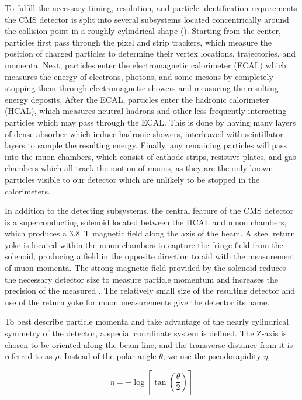 To fulfill the necessary timing, resolution, and particle identification requirements the CMS detector is split into several subsystems located concentrically around the collision point in a roughly cylindrical shape (). 
Starting from the center, particles first pass through the pixel and strip trackers, which measure the position of charged particles to determine their vertex locations, trajectories, and momenta.
Next, particles enter the electromagnetic calorimeter (ECAL) which measures the energy of electrons, photons, and some mesons by completely stopping them through electromagnetic showers and measuring the resulting energy deposits.
After the ECAL, particles enter the hadronic calorimeter (HCAL), which measures neutral hadrons and other less-frequently-interacting particles which may pass through the ECAL. This is done by having many layers of dense absorber which induce hadronic showers, interleaved with scintillator layers to sample the resulting energy.
Finally, any remaining particles will pass into the muon chambers, which consist of cathode strips, resistive plates, and gas chambers which all track the motion of muons, as they are the only known particles visible to our detector which are unlikely to be stopped in the calorimeters.

In addition to the detecting subsystems, the central feature of the CMS detector is a superconducting solenoid located between the HCAL and muon chambers, which produces a \SI{3.8}{\tesla} magnetic field along the axis of the beam. 
A steel return yoke is located within the muon chambers to capture the fringe field from the solenoid, producing a field in the opposite direction to aid with the measurement of muon momenta.
The strong magnetic field provided by the solenoid reduces the necessary detector size to measure particle momentum and increases the precision of the measured \pt. 
The relatively small size of the resulting detector and use of the return yoke for muon measurements give the detector its name.

To best describe particle momenta and take advantage of the nearly cylindrical symmetry of the detector, a special coordinate system is defined. 
The Z-axis is chosen to be oriented along the beam line, and the transverse distance from it is referred to as $\rho$. 
Instead of the polar angle $\theta$, we use the pseudorapidity $\eta$,

\begin{equation}
    \label{eq:pseudo}
    \eta = - \log \left[\tan\left(\frac{\theta}{2}\right)\right]
\end{equation}


